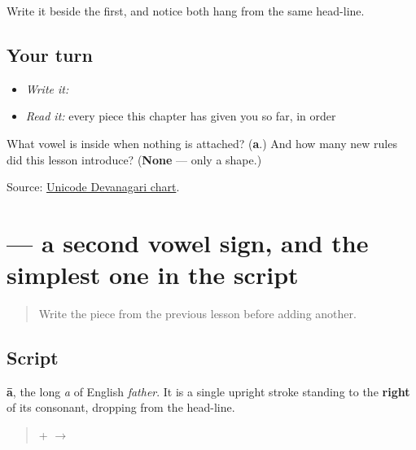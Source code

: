 Write it beside the first, and notice both hang from the same head-line.

\subsection*{Your turn}
\begin{itemize}
\raggedright
  \item \emph{Write it:} 
  \item \emph{Read it:} every piece this chapter has given you so far, in order
\end{itemize}

\begin{tcolorbox}[breakable,colback=teal!4,colframe=teal!35!black,title={Before you move on}]
What vowel is inside \textbf{} when nothing is attached? (\textbf{a}.) And how many new rules did this lesson introduce? (\textbf{None} — only a shape.)

Source: \href{https://www.unicode.org/charts/PDF/U0900.pdf}{Unicode Devanagari chart}.
\end{tcolorbox}
\section[\texorpdfstring{\mr{ा} (-ā)}{ा (-ā)}]{ — a second vowel sign, and the simplest one in the script}

\label{lesson:MR-W01-aa-matra}



\begin{quote}
Write the piece from the previous lesson before adding another.
\end{quote}

\subsection*{Script}

\begin{quote}
\end{quote}

\textbf{ā}, the long \emph{a} of English \emph{father}. It is a single upright stroke standing to the \textbf{right} of its consonant, dropping from the head-line.

\begin{quote}
\textbf{} + \textbf{} $\to$ \textbf{}
\end{quote}

